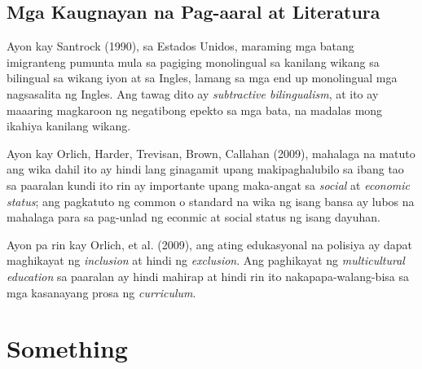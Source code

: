\documentclass [11pt] {report}
\begin{document}
\section {Mga Kaugnayan na Pag-aaral at Literatura}
Ayon kay Santrock (1990), sa Estados Unidos, maraming mga batang imigranteng
pumunta mula sa pagiging monolingual sa kanilang wikang sa bilingual sa wikang
iyon at sa Ingles, lamang sa mga end up monolingual mga nagsasalita ng Ingles.
Ang tawag dito ay \emph{subtractive bilingualism}, at ito ay maaaring magkaroon
ng negatibong epekto sa mga bata, na madalas mong ikahiya kanilang wikang.

Ayon kay Orlich, Harder, Trevisan, Brown, Callahan (2009), mahalaga na matuto ang
wika dahil ito ay hindi lang ginagamit upang makipaghalubilo sa ibang tao sa
paaralan kundi ito rin ay importante upang maka-angat sa \emph{social} at
\emph{economic status}; ang pagkatuto ng common o standard na wika ng isang
bansa ay lubos na mahalaga para sa pag-unlad ng econmic at social status ng
isang dayuhan.

Ayon pa rin kay Orlich, et al. (2009), ang ating edukasyonal na polisiya ay
dapat maghikayat ng \emph{inclusion} at hindi ng \emph{exclusion}. Ang
paghikayat ng \emph{multicultural education} sa paaralan ay hindi mahirap at
hindi rin ito nakapapa-walang-bisa sa mga kasanayang prosa ng \emph{curriculum}.

\chapter{Something}

\end{document}
